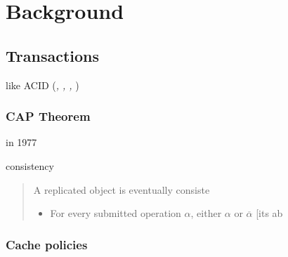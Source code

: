 
\section{Background}
\label{sec:background}


\subsection{Transactions}
\label{sec:background_transactions_consistency}

 like ACID (\textit{, , , })

\subsubsection{CAP Theorem}
\label{sec:background_cap}
 \citeauthor{rothnie1977ddbms} in 1977~\cite{rothnie1977ddbms}
%
\begin{commalistor}
    \item consistency
\end{commalistor}

\begin{quote}
    A replicated object is eventually consiste
    \begin{itemize}
        \item For every submitted operation $\alpha$, either $\alpha$ or $\overline{\alpha}$ [its ab
    \end{itemize}
\end{quote}

\subsubsection{Cache policies}
\label{sec:background_caching_policies}